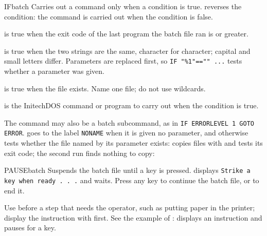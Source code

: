 \begin{DosEntry}{IF}{}{batch}
\Purpose Carries out a command only when a condition is true.
\Format {}
\Remarks
{} reverses the condition: the command is carried out when the
condition is false.

 is true when the exit code of the last program
the batch file ran is  or greater.

 is true when the two strings are the same,
character for character; capital and small letters differ.  Parameters are
replaced first, so \texttt{IF "\%1"=="" ...} tests whether a parameter was
given.

 is true when the file exists.  Name one file; do not
use wildcards.

 is the InitechDOS command or program to carry out when the
condition is true.

The command may also be a batch subcommand, as in
\texttt{IF ERRORLEVEL 1 GOTO ERROR}.
\Example
{} goes to the label \texttt{NONAME} when it is given no
parameter, and otherwise tests whether the file named by its parameter
exists:
 copies files with  and tests its exit code; the
second run finds nothing to copy:
\end{DosEntry}

\begin{DosEntry}{PAUSE}{}{batch}
\Purpose Suspends the batch file until a key is pressed.
\Format {}
\Remarks
{} displays \texttt{Strike a key when ready . . .} and waits.
Press any key to continue the batch file, or  to end it.

Use  before a step that needs the operator, such as putting
paper in the printer; display the instruction with  first.
\Example
See the example of :  displays an instruction
and pauses for a key.
\end{DosEntry}

